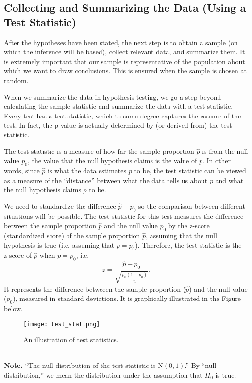 \documentclass[10pt, a4paper]{article}
\begin{document}
\subsection{Collecting and Summarizing the Data (Using a Test Statistic)}
After the hypotheses have been stated, the next step is to obtain a sample (on which the inference will be based), collect relevant data, and summarize them. It is extremely important that our sample is representative of the population about which we want to draw conclusions. This is ensured when the sample is chosen at random.\par
When we summarize the data in hypothesis testing, we go a step beyond calculating the sample statistic and summarize the data with a test statistic. Every test has a test statistic, which to some degree captures the essence of the test. In fact, the p-value is actually determined by (or derived from) the test statistic.\par
The test statistic is a measure of how far the sample proportion $\hat{p}$ is from the null value $p_0$, the value that the null hypothesis claims is the value of $p$. In other words, since $\hat{p}$ is what the data estimates $p$ to be, the test statistic can be viewed as a measure of the ``distance'' between what the data tells us about $p$ and what the null hypothesis claims $p$ to be.\par
We need to standardize the difference $\hat{p}-p_0$ so the comparison between different situations will be possible. The test statistic for this test measures the difference between the sample proportion $\hat{p}$ and the null value $p_0$ by the z-score (standardized score) of the sample proportion $\hat{p}$, assuming that the null hypothesis is true (i.e. assuming that $p=p_0$). Therefore, the test statistic is the z-score of $\hat{p}$ when $p=p_0$, i.e.
\[
    z=\frac{\hat{p}-p_0}{\sqrt{\frac{p_0(1-p_0)}{n}}}.
\]
It represents the difference betweeen the sample proportion ($\hat{p}$) and the null value ($p_0$), measured in standard deviations. It is graphically illustrated in the Figure below.
\begin{figure}
[h!]
    \centering
    \texttt{[image: test\_stat.png]}
    \caption{An illustration of test statistics.}
\end{figure}\\
\textbf{Note.} ``The null distribution of the test statistic is $\mathrm{N}(0,1)$.'' By ``null distribution,'' we mean the distribution under the assumption that $H_0$ is true.\par
\end{document}
